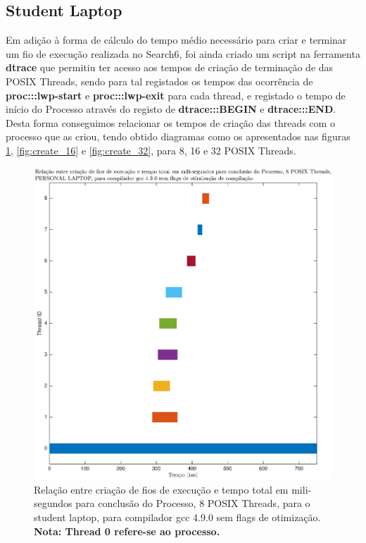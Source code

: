 \documentclass[conference,compsoc]{IEEEtran}
\begin{document}
\subsection{Student Laptop}

Em adição à forma de cálculo do tempo médio necessário para criar e  terminar um fio de execução realizada no Search6, foi ainda criado um script na ferramenta \textbf{dtrace} que permitiu ter acesso aos tempos de criação de terminação de das POSIX Threads, sendo para tal registados os tempos das ocorrência de \textbf{proc:::lwp-start} e \textbf{proc:::lwp-exit} para cada thread, e registado o tempo de início do Processo através do registo de \textbf{dtrace:::BEGIN} e \textbf{dtrace:::END}. Desta forma conseguimos relacionar os tempos de criação das threads com o processo que as criou, tendo obtido diagramas como os apresentados nas figuras \ref{fig:create_8}, \ref{fig:create_16} e \ref{fig:create_32}, para 8, 16 e 32 POSIX Threads.
 
 
 
\begin{figure}[H]
\centering
\includegraphics[width=1.1\columnwidth]{EPS/time_create_8T.eps}
\caption{Relação entre criação de fios de execução e tempo total em mili-segundos para conclusão do Processo, 8 POSIX Threads, para o student laptop, para compilador gcc 4.9.0 sem flags de otimização. \textbf{Nota: Thread 0 refere-se ao processo.}}
\label{fig:create_8}
\end{figure}
\end{document}
